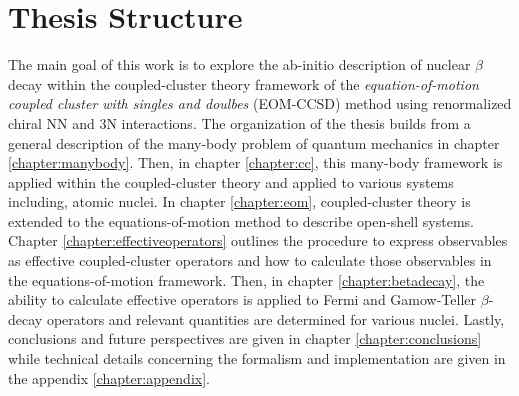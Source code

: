 \documentclass[../thesis.tex]{subfiles}
\begin{document}
\section{Thesis Structure}

The main goal of this work is to explore the ab-initio description of nuclear $\beta$ decay within the coupled-cluster theory framework of the \textit{equation-of-motion coupled cluster with singles and doulbes} (EOM-CCSD) method using renormalized chiral NN and 3N interactions.  The organization of the thesis builds from a general description of the many-body problem of quantum mechanics in chapter \ref{chapter:manybody}. Then, in chapter \ref{chapter:cc}, this many-body framework is applied within the coupled-cluster theory and applied to various systems including, atomic nuclei. In chapter \ref{chapter:eom}, coupled-cluster theory is extended to the equations-of-motion method to describe open-shell systems.  Chapter \ref{chapter:effectiveoperators} outlines the procedure to express observables as effective coupled-cluster operators and how to calculate those observables in the equations-of-motion framework.  Then, in chapter \ref{chapter:betadecay}, the ability to calculate effective operators is applied to Fermi and Gamow-Teller $\beta$-decay operators and relevant quantities are determined for various nuclei.  Lastly, conclusions and future perspectives are given in chapter \ref{chapter:conclusions} while technical details concerning the formalism and implementation are given in the appendix \ref{chapter:appendix}.
\end{document}
